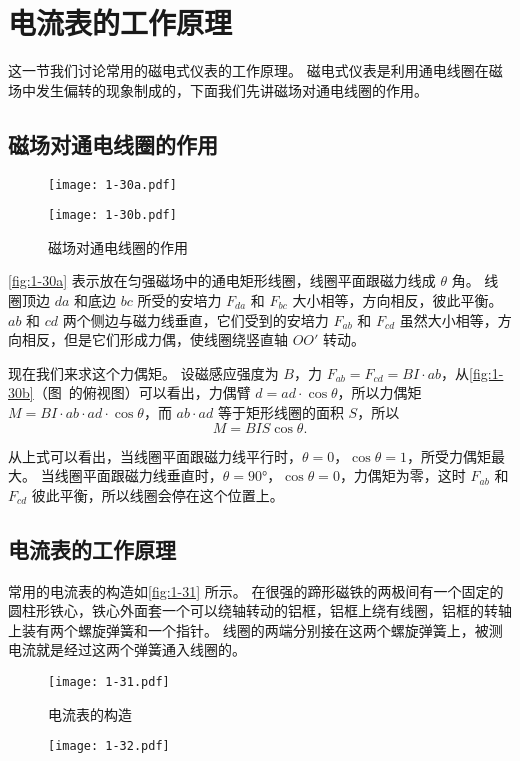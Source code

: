 \section{电流表的工作原理}
这一节我们讨论常用的磁电式仪表的工作原理。
磁电式仪表是利用通电线圈在磁场中发生偏转的现象制成的，下面我们先讲磁场对通电线圈的作用。

\subsection{磁场对通电线圈的作用}
\begin{figure}
	\begin{minipage}[b]{0.48\linewidth}\centering
		\texttt{[image: 1-30a.pdf]}
		\subcaption{}\label{fig:1-30a}
	\end{minipage}
	\begin{minipage}[b]{0.48\linewidth}\centering
		\texttt{[image: 1-30b.pdf]}
		\subcaption{}\label{fig:1-30b}
	\end{minipage}
	\caption{磁场对通电线圈的作用}\label{fig:1-30}
\end{figure}

\cref{fig:1-30a} 表示放在匀强磁场中的通电矩形线圈，线圈平面跟磁力线成 $\theta$ 角。
线圈顶边 $da$ 和底边 $bc$ 所受的安培力 $F_{da}$ 和 $F_{bc}$ 大小相等，方向相反，彼此平衡。
$ab$ 和 $cd$ 两个侧边与磁力线垂直，它们受到的安培力 $F_{ab}$ 和 $F_{cd}$ 虽然大小相等，方向相反，但是它们形成力偶，使线圈绕竖直轴 $OO'$ 转动。

现在我们来求这个力偶矩。
设磁感应强度为 $B$，力 $F_{ab}=F_{cd}=BI·ab$，从\cref{fig:1-30b}（图~的俯视图）可以看出，力偶臂 $d=ad\cdot \cos\theta$，所以力偶矩 $M=BI\cdot ab\cdot ad\cdot \cos\theta$，而 $ab\cdot ad$ 等于矩形线圈的面积 $S$，所以
\[ M=BIS\cos\theta.\]

从上式可以看出，当线圈平面跟磁力线平行时，$\theta=0$，$\cos\theta=1$，所受力偶矩最大。
当线圈平面跟磁力线垂直时，$\theta=\ang{90}$，$\cos\theta=0$，力偶矩为零，这时 $F_{ab}$ 和 $F_{cd}$ 彼此平衡，所以线圈会停在这个位置上。

\subsection{电流表的工作原理}

常用的电流表的构造如\cref{fig:1-31} 所示。
在很强的蹄形磁铁的两极间有一个固定的圆柱形铁心，铁心外面套一个可以绕轴转动的铝框，铝框上绕有线圈，铝框的转轴上装有两个螺旋弹簧和一个指针。
线圈的两端分别接在这两个螺旋弹簧上，被测电流就是经过这两个弹簧通入线圈的。
\begin{figure}
	\begin{minipage}[b]{0.48\linewidth}
		\centering
		\texttt{[image: 1-31.pdf]}
		\caption{电流表的构造}\label{fig:1-31}
	\end{minipage}
	\begin{minipage}[b]{0.48\linewidth}
		\centering
		\texttt{[image: 1-32.pdf]}
		\caption{}\label{fig:1-32}
	\end{minipage}
\end{figure}

